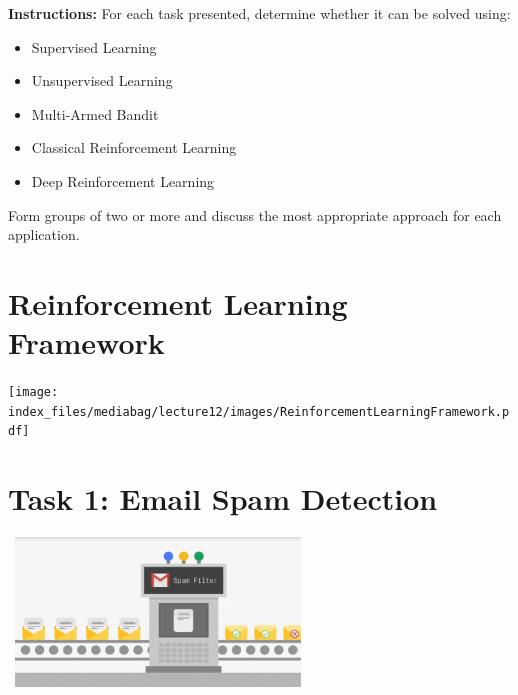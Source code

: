 \documentclass[
  letterpaper,
  DIV=11,
  numbers=noendperiod]{scrreprt}
\providecommand{\tightlist}{%
  \setlength{\itemsep}{0pt}\setlength{\parskip}{0pt}}\usepackage{longtable,booktabs,array}
\begin{document}
\begin{tcolorbox}[enhanced jigsaw, toprule=.15mm, leftrule=.75mm, coltitle=black, left=2mm, opacityback=0, titlerule=0mm, arc=.35mm, toptitle=1mm, opacitybacktitle=0.6, bottomtitle=1mm, colframe=quarto-callout-note-color-frame, title=\textcolor{quarto-callout-note-color}{\faInfo}\hspace{0.5em}{Note}, rightrule=.15mm, bottomrule=.15mm, colbacktitle=quarto-callout-note-color!10!white, breakable, colback=white]

\textbf{Instructions:} For each task presented, determine whether it can
be solved using:

\begin{itemize}
\tightlist
\item
  Supervised Learning\\
\item
  Unsupervised Learning\\
\item
  Multi-Armed Bandit\\
\item
  Classical Reinforcement Learning\\
\item
  Deep Reinforcement Learning
\end{itemize}

Form groups of two or more and discuss the most appropriate approach for
each application.

\end{tcolorbox}

\section{Reinforcement Learning
Framework}\label{reinforcement-learning-framework}

\texttt{[image: index\_files/mediabag/lecture12/images/ReinforcementLearningFramework.pdf]}

\section{Task 1: Email Spam
Detection}\label{task-1-email-spam-detection}

\includegraphics[width=3.125in,height=1.5625in]{lecture12/images/SupervisedLearning.png}
\end{document}
